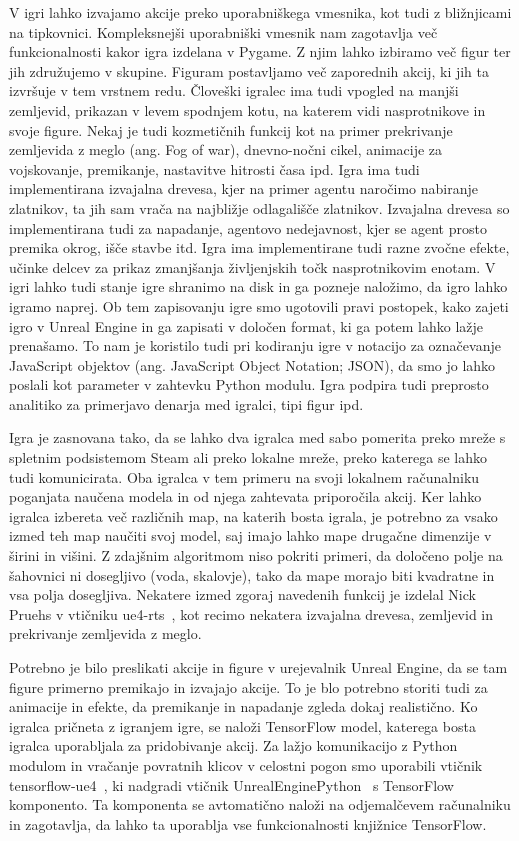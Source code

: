 \documentclass[a4paper, 12pt]{book}
\begin{document}
V igri lahko izvajamo akcije preko uporabniškega vmesnika, kot tudi z bližnjicami na tipkovnici.
Kompleksnejši uporabniški vmesnik nam zagotavlja več funkcionalnosti kakor igra izdelana v Pygame.
Z njim lahko izbiramo več figur ter jih združujemo v skupine.
Figuram postavljamo več zaporednih akcij, ki jih ta izvršuje v tem vrstnem redu.
Človeški igralec ima tudi vpogled na manjši zemljevid, prikazan v levem spodnjem kotu, na katerem vidi nasprotnikove in svoje figure.
Nekaj je tudi kozmetičnih funkcij kot na primer prekrivanje zemljevida z meglo (ang. Fog of war), dnevno-nočni cikel, animacije za vojskovanje, premikanje, nastavitve hitrosti časa ipd.
Igra ima tudi implementirana izvajalna drevesa, kjer na primer agentu naročimo nabiranje zlatnikov, ta jih sam vrača na najbližje odlagališče zlatnikov.
Izvajalna drevesa so implementirana tudi za napadanje, agentovo nedejavnost, kjer se agent prosto premika okrog, išče stavbe itd.
Igra ima implementirane tudi razne zvočne efekte, učinke delcev za prikaz zmanjšanja življenjskih točk nasprotnikovim enotam.
V igri lahko tudi stanje igre shranimo na disk in ga pozneje naložimo, da igro lahko igramo naprej.
Ob tem zapisovanju igre smo ugotovili pravi postopek, kako zajeti igro v Unreal Engine in ga zapisati v določen format, ki ga potem lahko lažje prenašamo.
To nam je koristilo tudi pri kodiranju igre v notacijo za označevanje JavaScript objektov (ang. JavaScript Object Notation; JSON), da smo jo lahko poslali kot parameter v zahtevku Python modulu.
Igra podpira tudi preprosto analitiko za primerjavo denarja med igralci, tipi figur ipd.

Igra je zasnovana tako, da se lahko dva igralca med sabo pomerita preko mreže s spletnim podsistemom Steam ali preko lokalne mreže, preko katerega se lahko tudi komunicirata.
Oba igralca v tem primeru na svoji lokalnem računalniku poganjata naučena modela in od njega zahtevata priporočila akcij.
Ker lahko igralca izbereta več različnih map, na katerih bosta igrala, je potrebno za vsako izmed teh map naučiti svoj model, saj imajo lahko mape drugačne dimenzije v širini in višini.
Z zdajšnim algoritmom niso pokriti primeri, da določeno polje na šahovnici ni dosegljivo (voda, skalovje), tako da mape morajo biti kvadratne in vsa polja dosegljiva.
Nekatere izmed zgoraj navedenih funkcij je izdelal Nick Pruehs v vtičniku ue4-rts~\cite{rtsUe4}, kot recimo nekatera izvajalna drevesa, zemljevid in prekrivanje zemljevida z meglo.

Potrebno je bilo preslikati akcije in figure v urejevalnik Unreal Engine, da se tam figure primerno premikajo in izvajajo akcije.
To je blo potrebno storiti tudi za animacije in efekte, da premikanje in napadanje zgleda dokaj realistično.
Ko igralca pričneta z igranjem igre, se naloži TensorFlow model, katerega bosta igralca uporabljala za pridobivanje akcij.
Za lažjo komunikacijo z Python modulom in vračanje povratnih klicov v celostni pogon smo uporabili vtičnik tensorflow-ue4~\cite{ue4tf}, ki nadgradi vtičnik UnrealEnginePython~\cite{ue4python} s TensorFlow komponento. 
Ta komponenta se avtomatično naloži na odjemalčevem računalniku in zagotavlja, da lahko ta uporablja vse funkcionalnosti knjižnice TensorFlow.
 
\end{document}
